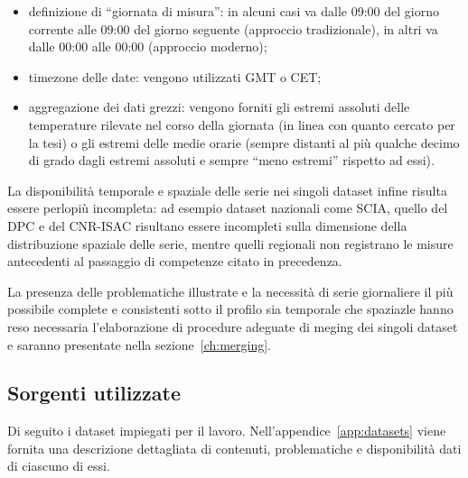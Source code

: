 \begin{itemize}
  \item
    definizione di ``giornata di misura'': in alcuni casi va dalle 09:00 del giorno corrente alle 09:00 del giorno seguente (approccio tradizionale), in altri va dalle 00:00 alle 00:00 (approccio moderno);
  \item
    timezone delle date: vengono utilizzati GMT o CET;
  \item
    aggregazione dei dati grezzi: vengono forniti gli estremi assoluti delle temperature rilevate nel corso della giornata (in linea con quanto cercato per la tesi) o gli estremi delle medie orarie (sempre distanti al più qualche decimo di grado dagli estremi assoluti e sempre ``meno estremi'' rispetto ad essi).
\end{itemize}

La disponibilità temporale e spaziale delle serie nei singoli dataset infine risulta essere perlopiù incompleta: ad esempio dataset nazionali come SCIA, quello del DPC e del CNR-ISAC risultano essere incompleti sulla dimensione della distribuzione spaziale delle serie, mentre quelli regionali non registrano le misure antecedenti al passaggio di competenze citato in precedenza.

La presenza delle problematiche illustrate e la necessità di serie giornaliere il più possibile complete e consistenti sotto il profilo sia temporale che spaziazle hanno reso necessaria l'elaborazione di procedure adeguate di meging dei singoli dataset e saranno presentate nella sezione~\ref{ch:merging}.

\subsection{Sorgenti utilizzate}\label{ch:sources}
Di seguito i dataset impiegati per il lavoro. Nell'appendice~\ref{app:datasets} viene fornita una descrizione dettagliata di contenuti, problematiche e disponibilità dati di ciascuno di essi.

